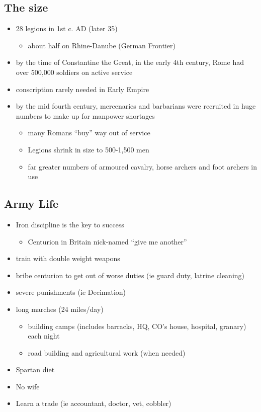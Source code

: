 \documentclass[12pt, twoside]{article}
\begin{document}
\subsection{The size}
\begin{itemize}
\item 28 legions in 1st c. AD (later 35)
	\begin{itemize}
	\item about half on Rhine-Danube (German Frontier)
	\end{itemize}
\item by the time of Constantine the Great, in the early 4th century, Rome had over 500,000 soldiers on active service
\item conscription rarely needed in Early Empire
\item by the mid fourth century, mercenaries and barbarians were recruited in huge numbers to make up for manpower shortages
	\begin{itemize}
	\item many Romans “buy” way out of service
	\item Legions shrink in size to 500-1,500 men
	\item far greater numbers of armoured cavalry, horse archers and foot archers in use
	\end{itemize}
\end{itemize}

\subsection{Army Life}
\begin{itemize}
\item Iron discipline is the key to success
	\begin{itemize}
	\item Centurion in Britain nick-named “give me another”
	\end{itemize}
\item train with double weight weapons
\item bribe centurion to get out of worse duties (ie guard duty, latrine cleaning)
\item severe punishments (ie Decimation)
\item long marches (24 miles/day)
	\begin{itemize}
	\item building camps (includes barracks, HQ, CO's house, hospital, granary) each night
	\item road building and agricultural work (when needed)
	\end{itemize}
\item Spartan diet
\item No wife
\item Learn a trade (ie accountant, doctor, vet, cobbler)
\end{itemize}
\end{document}
